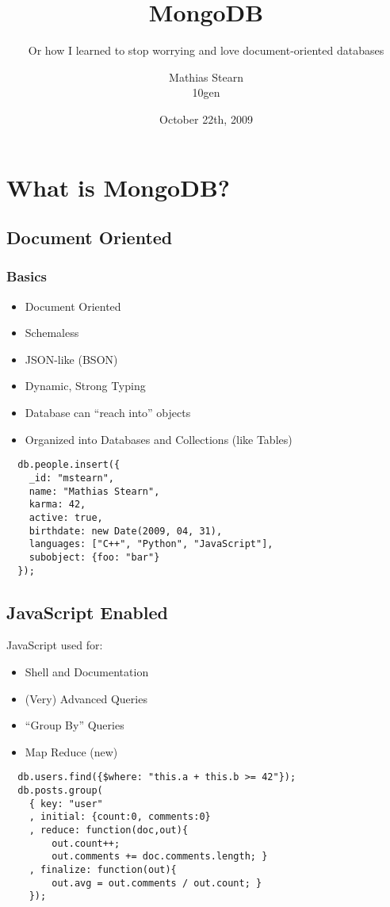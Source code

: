 \documentclass{beamer}
\title{MongoDB}
\subtitle{Or how I learned to stop worrying and love document-oriented databases}
\author{Mathias Stearn \\ 10gen}
\date{October 22th, 2009}
\begin{document}
\frame{\titlepage}

\section[Outline]{}
\frame{\tableofcontents}

\section{What is MongoDB?}
\subsection{Document Oriented}
\begin{frame}[fragile]
  \frametitle{Basics}

  \begin{itemize}
    \item Document Oriented
    \item Schemaless
    \item JSON-like (BSON)
    \item Dynamic, Strong Typing
    \item Database can ``reach into'' objects
    \item Organized into Databases and Collections (like Tables)
  \end{itemize}

  \begin{verbatim}
  db.people.insert({
    _id: "mstearn",
    name: "Mathias Stearn",
    karma: 42,
    active: true,
    birthdate: new Date(2009, 04, 31),
    languages: ["C++", "Python", "JavaScript"],
    subobject: {foo: "bar"}
  });
  \end{verbatim}

\end{frame}

\subsection{JavaScript Enabled}
\begin{frame}[fragile]
  JavaScript used for:
  \begin{itemize}
    \item Shell and Documentation
    \item (Very) Advanced Queries
    \item ``Group By'' Queries
    \item Map Reduce (new)
  \end{itemize}

  \begin{verbatim}
  db.users.find({$where: "this.a + this.b >= 42"});
  db.posts.group(
    { key: "user"
    , initial: {count:0, comments:0}
    , reduce: function(doc,out){
        out.count++;
        out.comments += doc.comments.length; }
    , finalize: function(out){ 
        out.avg = out.comments / out.count; }
    });
  \end{verbatim}
\end{frame}
\end{document}

